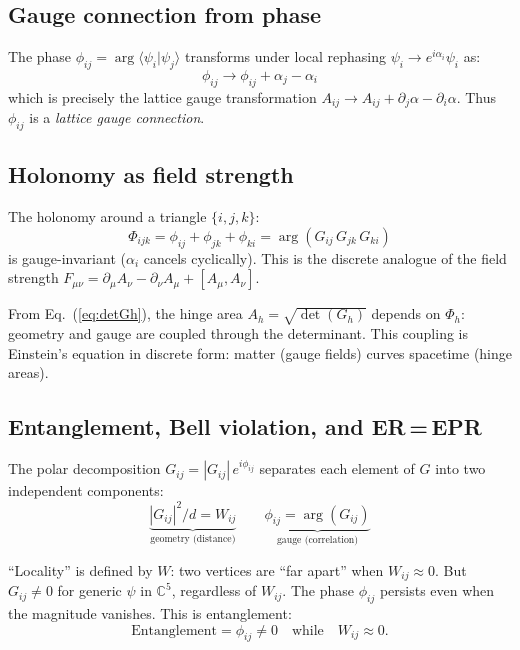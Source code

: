 \documentclass[12pt]{article}
\theoremstyle{remark}
\theoremstyle{definition}
\begin{document}
\subsection{Gauge connection from phase}
\label{sec:gauge_connection}

The phase $\phi_{ij} = \arg\langle\psi_i|\psi_j\rangle$ transforms under local rephasing $\psi_i \to e^{i\alpha_i}\psi_i$ as:
\begin{equation}
\phi_{ij} \to \phi_{ij} + \alpha_j - \alpha_i
\end{equation}
which is precisely the lattice gauge transformation $A_{ij} \to A_{ij} + \partial_j\alpha - \partial_i\alpha$. Thus $\phi_{ij}$ is a \emph{lattice gauge connection}.

\subsection{Holonomy as field strength}
\label{sec:holonomy}

The holonomy around a triangle $\{i, j, k\}$:
\begin{equation}
\Phi_{ijk} = \phi_{ij} + \phi_{jk} + \phi_{ki} = \arg(G_{ij}\,G_{jk}\,G_{ki})
\end{equation}
is gauge-invariant ($\alpha_i$ cancels cyclically). This is the discrete analogue of the field strength $F_{\mu\nu} = \partial_\mu A_\nu - \partial_\nu A_\mu + [A_\mu, A_\nu]$.

From Eq.~(\ref{eq:detGh}), the hinge area $A_h = \sqrt{\det(G_h)}$ depends on $\Phi_h$: geometry and gauge are coupled through the determinant. This coupling is Einstein's equation in discrete form: matter (gauge fields) curves spacetime (hinge areas).

\subsection{Entanglement, Bell violation, and ER\,=\,EPR}

The polar decomposition $G_{ij} = |G_{ij}|\,e^{i\phi_{ij}}$ separates each element of $G$ into two independent components:
\begin{equation}
\underbrace{|G_{ij}|^2/d = W_{ij}}_{\text{geometry (distance)}} \qquad \underbrace{\phi_{ij} = \arg(G_{ij})}_{\text{gauge (correlation)}}
\end{equation}

``Locality'' is defined by $W$: two vertices are ``far apart'' when $W_{ij} \approx 0$. But $G_{ij} \neq 0$ for generic $\psi$ in $\mathbb{C}^5$, regardless of $W_{ij}$. The phase $\phi_{ij}$ persists even when the magnitude vanishes. This is entanglement:
\begin{equation}
\text{Entanglement} = \phi_{ij} \neq 0 \quad\text{while}\quad W_{ij} \approx 0.
\end{equation}
\end{document}
